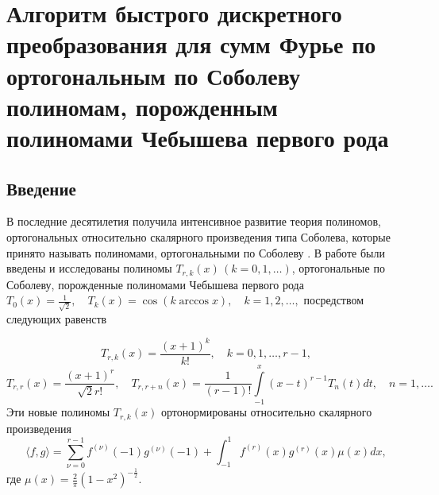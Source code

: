 \section{Алгоритм быстрого дискретного преобразования для сумм Фурье по ортогональным по Соболеву полиномам, порожденным полиномами Чебышева первого рода}

\subsection{Введение}

В последние десятилетия получила интенсивное развитие теория полиномов, ортогональных относительно скалярного произведения типа Соболева, которые принято называть полиномами, ортогональными  по Соболеву \cite{sms-stn-1-MarcelXu, RamShaIzv}. В работе \cite{RamShaIzv} были введены и исследованы полиномы $T_{r,k}(x)\,(k=0,1,\ldots)$, ортогональные по Соболеву, порожденные полиномами Чебышева первого рода
$T_0(x)=\frac{1}{\sqrt{2}},\quad T_k(x)=\cos(k\arccos x), \quad k=1,2,\ldots,$
посредством следующих равенств

\begin{equation}\label{sms-stn-1-sobcheb3}
T_{r,k}(x) =\frac{(x+1)^k}{k!}, \quad k=0,1,\ldots, r-1,
\end{equation}
\begin{equation}\label{sms-stn-1-sobcheb4}
T_{r,r}(x) =\frac{(x+1)^r}{\sqrt{2}r!},\quad T_{r,r+n}(x) =\frac{1}{(r-1)!}\int\limits_{-1}^x(x-t)^{r-1}T_{n}(t)dt, \quad n=1,\ldots.
\end{equation}
Эти новые полиномы $T_{r,k}(x)$ ортонормированы \cite{RamShaIzv} относительно скалярного произведения
\begin{equation}\label{sms-stn-1-sobcheb2}
\langle f,g\rangle=\sum_{\nu=0}^{r-1}f^{(\nu)}(-1)g^{(\nu)}(-1)+\int_{-1}^{1}f^{(r)}(x)g^{(r)}(x)\mu(x)dx,
\end{equation}
где $\mu(x)=\frac2\pi(1-x^2)^{-\frac12}$.

